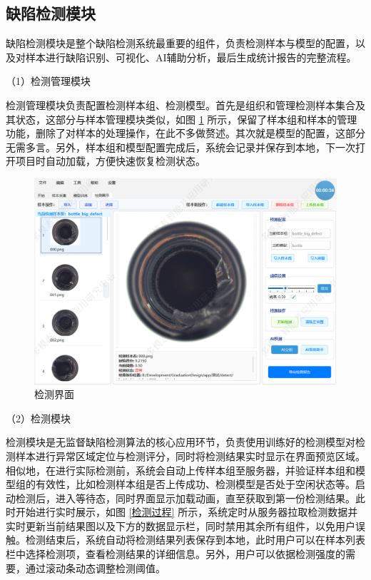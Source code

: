 \documentclass[
  ]{njuthesis}
\begin{document}
\subsection{缺陷检测模块}

缺陷检测模块是整个缺陷检测系统最重要的组件，负责检测样本与模型的配置，以及对样本进行缺陷识别、可视化、AI辅助分析，最后生成统计报告的完整流程。

（1）检测管理模块

检测管理模块负责配置检测样本组、检测模型。首先是组织和管理检测样本集合及其状态，这部分与样本管理模块类似，如图 \ref{检测界面} 所示，保留了样本组和样本的管理功能，删除了对样本的处理操作，在此不多做赘述。其次就是模型的配置，这部分无需多言。另外，样本组和模型配置完成后，系统会记录并保存到本地，下一次打开项目时自动加载，方便快速恢复检测状态。

\begin{figure}[htb]
    \centering
    \includegraphics[width=\textwidth]{images/检测界面.png}
    \caption{检测界面}
    \label{检测界面}
\end{figure}

（2）检测模块

检测模块是无监督缺陷检测算法的核心应用环节，负责使用训练好的检测模型对检测样本进行异常区域定位与检测评分，同时将检测结果实时显示在界面预览区域。相似地，在进行实际检测前，系统会自动上传样本组至服务器，并验证样本组和模型组的有效性，比如检测样本组是否上传成功、检测模型是否处于空闲状态等。启动检测后，进入等待态，同时界面显示加载动画，直至获取到第一份检测结果。此时开始进行实时展示，如图 \ref{检测过程} 所示，系统定时从服务器拉取检测数据并实时更新当前结果图以及下方的数据显示栏，同时禁用其余所有组件，以免用户误触。检测结束后，系统自动将检测结果列表保存到本地，此时用户可以在样本列表栏中选择检测项，查看检测结果的详细信息。另外，用户可以依据检测强度的需要，通过滚动条动态调整检测阈值。
\end{document}
